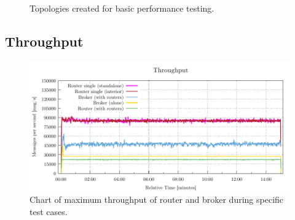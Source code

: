 \begin{figure}[h]
	\centering
	\begin{minipage}{0.45\linewidth}
	\end{minipage}
	\begin{minipage}{0.45\linewidth}
	\end{minipage}
	\caption[A simple network with active router agent.]{Topologies created for basic performance testing.}\label{fig:basic_topologies}
\end{figure}

\subsection{Throughput}
\label{Throughput}

\begin{figure}[h]
	\centering
	\includegraphics[width=1\linewidth]{obrazky-figures/charts-excel/throughput.pdf}
	\caption{Chart of maximum throughput of router and broker during specific test cases.}
	\label{fig:max_rate}
\end{figure}

